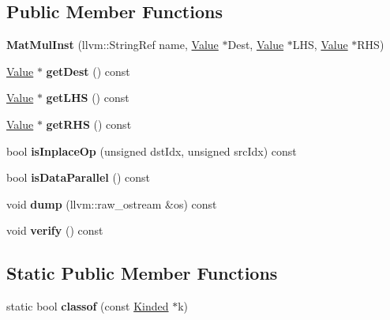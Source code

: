 \subsection*{Public Member Functions}
\begin{DoxyCompactItemize}
\item 
\mbox{\label{classglow_1_1_mat_mul_inst_a0473e8437855d1b548f777a70db72522}} 
{\bfseries Mat\+Mul\+Inst} (llvm\+::\+String\+Ref name, \hyperlink{classglow_1_1_value}{Value} $\ast$Dest, \hyperlink{classglow_1_1_value}{Value} $\ast$L\+HS, \hyperlink{classglow_1_1_value}{Value} $\ast$R\+HS)
\item 
\mbox{\label{classglow_1_1_mat_mul_inst_ae20d41e21b31439a7398b9efd06f4b5d}} 
\hyperlink{classglow_1_1_value}{Value} $\ast$ {\bfseries get\+Dest} () const
\item 
\mbox{\label{classglow_1_1_mat_mul_inst_acbe89032e55627a530e0681fb632074d}} 
\hyperlink{classglow_1_1_value}{Value} $\ast$ {\bfseries get\+L\+HS} () const
\item 
\mbox{\label{classglow_1_1_mat_mul_inst_a75b8a83eb30eb36edd3cb7e5ee1c43e8}} 
\hyperlink{classglow_1_1_value}{Value} $\ast$ {\bfseries get\+R\+HS} () const
\item 
\mbox{\label{classglow_1_1_mat_mul_inst_a2da4d4f598fc6cab6e1b1d3ce6b149ff}} 
bool {\bfseries is\+Inplace\+Op} (unsigned dst\+Idx, unsigned src\+Idx) const
\item 
\mbox{\label{classglow_1_1_mat_mul_inst_af0a505146702b47c74b848ed9f575f21}} 
bool {\bfseries is\+Data\+Parallel} () const
\item 
\mbox{\label{classglow_1_1_mat_mul_inst_acf30408d814dcedd69f972755e5af147}} 
void {\bfseries dump} (llvm\+::raw\+\_\+ostream \&os) const
\item 
\mbox{\label{classglow_1_1_mat_mul_inst_abb7f88d0af7676c1c15287ed9b2457ee}} 
void {\bfseries verify} () const
\end{DoxyCompactItemize}
\subsection*{Static Public Member Functions}
\begin{DoxyCompactItemize}
\item 
\mbox{\label{classglow_1_1_mat_mul_inst_a121465cbc91e13071c45708873458b90}} 
static bool {\bfseries classof} (const \hyperlink{classglow_1_1_kinded}{Kinded} $\ast$k)
\end{DoxyCompactItemize}
